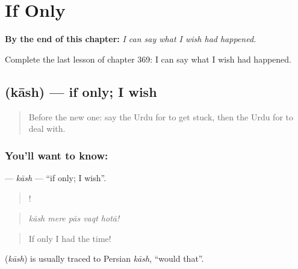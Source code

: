 
\chapter{If Only}
\label{ch:ur-if-only}

\begin{chapteropening}
\textbf{By the end of this chapter:} \emph{I can say what I wish had happened.}

Complete the last lesson of chapter 369: I can say what I wish had happened.
\end{chapteropening}

\section[\texorpdfstring{\ur{کاش} (kāsh)}{کاش (kāsh)}]{ (kāsh) — if only; I wish}

\label{lesson:UR-C369-kash}



\begin{quote}
Before the new one: say the Urdu for to get stuck, then the Urdu for to deal with.
\end{quote}

\subsection*{You'll want to know: }
\textbf{} — \emph{kāsh} — \textquotedblleft{}if only; I wish\textquotedblright{}.

\begin{quote}
    !
\end{quote}

\begin{quote}
\emph{kāsh mere pās vaqt hotā!}
\end{quote}

\begin{quote}
If only I had the time!
\end{quote}

\begin{cousinweb}
\textbf{} (\emph{kāsh}) is usually traced to Persian \emph{kāsh}, \textquotedblleft{}would that\textquotedblright{}.
\end{cousinweb}

